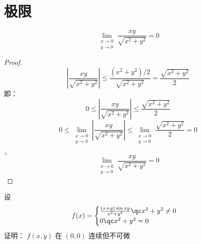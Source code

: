 \section{极限}%
\begin{exercise}
	\begin{equation*}
		\lim_{\substack{x \to 0 \\ y \to 0}} \frac{xy}{\sqrt{x^2 + y^2}} = 0
	\end{equation*}
\end{exercise}
\begin{proof}
	\begin{equation}
		\left|  \frac{xy}{\sqrt{x^2 + y^2}} \right|
		\leq
		\frac{(x^2+y^2) / 2}{ \sqrt{x^2 + y^2} }
		=
		\frac{\sqrt{x^2 + y^2}}{2}
	\end{equation}
	即：
	\begin{equation*}
		0
		\leq
		\left|  \frac{xy}{\sqrt{x^2 + y^2}} \right|
		\leq
		\frac{\sqrt{x^2 + y^2}}{2}
	\end{equation*}
	\begin{equation}
		0
		\leq
		\lim_{\substack{x \to 0 \\ y \to 0}}
		\left|  \frac{xy}{\sqrt{x^2 + y^2}} \right|
		\leq
		\lim_{\substack{x \to 0 \\ y \to 0}}
		\frac{\sqrt{x^2 + y^2}}{2}
		=
		0
	\end{equation}

	\( 		\therefore \)
	\begin{equation}
		\lim_{\substack{x \to 0 \\ y \to 0}} \frac{xy}{\sqrt{x^2 + y^2}} = 0
	\end{equation}
\end{proof}
\begin{exercise}
	设
	\begin{equation*}
		f(x) =
		\begin{cases}
			\frac{(x+y) \sin xy }{x^2 + y^2} \qc x^2 + y^2 \neq 0 \\
			0 \qc x^2 + y^2 = 0
		\end{cases}
	\end{equation*}
	证明：
	\( f(x,y) \) 在 \( (0,0) \) 连续但不可微
\end{exercise}
